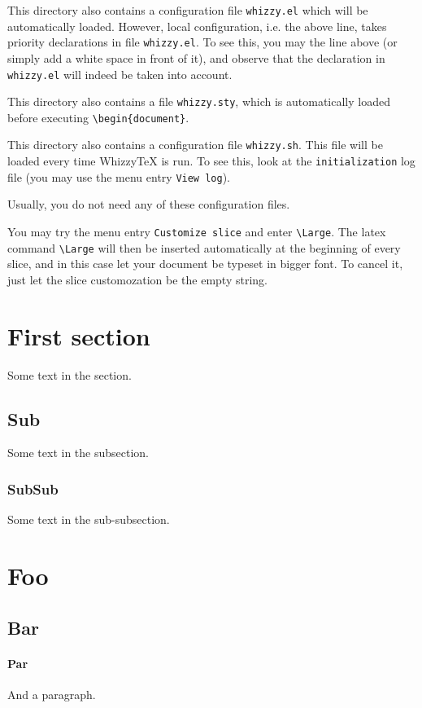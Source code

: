\documentclass{article}
\begin{document}
This directory also contains a configuration file \texttt{whizzy.el} which
will be automatically loaded.  However, local configuration, {i.e.} the above
line, takes priority declarations in file \texttt{whizzy.el}.  To see this,
you may the line above (or simply add a white space in front of it), and
observe that the declaration in \texttt{whizzy.el} will indeed be taken into
account.

This directory also contains a file \texttt{whizzy.sty}, which is
automatically loaded before executing \verb$\begin{document}$.

This directory also contains a configuration file \texttt{whizzy.sh}.
This file will be loaded every time WhizzyTeX is run. To see this, look 
at the \texttt{initialization} log file (you may use the menu entry 
\texttt{View log}). 

Usually, you do not need any of these configuration files. 

You may try the menu entry \texttt{Customize slice} and enter 
\verb"\Large". The latex command \verb"\Large" will then be inserted
automatically at the beginning of every slice, and in this case let your
document be typeset in bigger font. To cancel it, just let the slice 
customozation be the empty string. 

\section {First section}

Some text in the section.   
 
\subsection {Sub}
  
Some text in the subsection.

\subsubsection {SubSub} 

Some text in the sub-subsection. 


\section{Foo}

\subsection {Bar}

\paragraph {Par}

And a paragraph.
\end{document}
